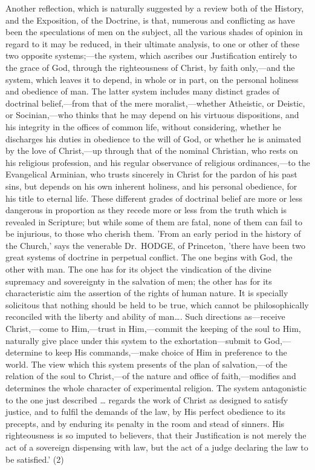 \documentclass[
]{book}
\begin{document}
Another reflection, which is naturally suggested by a review both of the History, and the Exposition, of the Doctrine, is that, numerous and conflicting as have been the speculations of men on the subject, all the various shades of opinion in regard to it may be reduced, in their ultimate analysis, to one or other of these two opposite systems;---the system, which ascribes our Justification entirely to the grace of God, through the righteousness of Christ, by faith only,---and the system, which leaves it to depend, in whole or in part, on the personal holiness and obedience of man. The latter system includes many distinct grades of doctrinal belief,---from that of the mere moralist,---whether Atheistic, or Deistic, or Socinian,---who thinks that he may depend on his virtuous dispositions, and his integrity in the offices of common life, without considering, whether he discharges his duties in obedience to the will of God, or whether he is animated by the love of Christ,---up through that of the nominal Christian, who rests on his religious profession, and his regular observance of religious ordinances,---to the Evangelical Arminian, who trusts sincerely in Christ for the pardon of his past sins, but depends on his own inherent holiness, and his personal obedience, for his title to eternal life. These different grades of doctrinal belief are more or less dangerous in proportion as they recede more or less from the truth which is revealed in Scripture; but while some of them are fatal, none of them can fail to be injurious, to those who cherish them. 'From an early period in the history of the Church,' says the venerable Dr.~HODGE, of Princeton, 'there have been two great systems of doctrine in perpetual conflict. The one begins with God, the other with man. The one has for its object the vindication of the divine supremacy and sovereignty in the salvation of men; the other has for its characteristic aim the assertion of the rights of human nature. It is specially solicitous that nothing should be held to be true, which cannot be philosophically reconciled with the liberty and ability of man\ldots. Such directions as---receive Christ,---come to Him,---trust in Him,---commit the keeping of the soul to Him, naturally give place under this system to the exhortation---submit to God,---determine to keep His commands,---make choice of Him in preference to the world. The view which this system presents of the plan of salvation,---of the relation of the soul to Christ,---of the nature and office of faith,---modifies and determines the whole character of experimental religion. The system antagonistic to the one just described \ldots{} regards the work of Christ as designed to satisfy justice, and to fulfil the demands of the law, by His perfect obedience to its precepts, and by enduring its penalty in the room and stead of sinners. His righteousness is so imputed to believers, that their Justification is not merely the act of a sovereign dispensing with law, but the act of a judge declaring the law to be satisfied.' (2)
\end{document}
